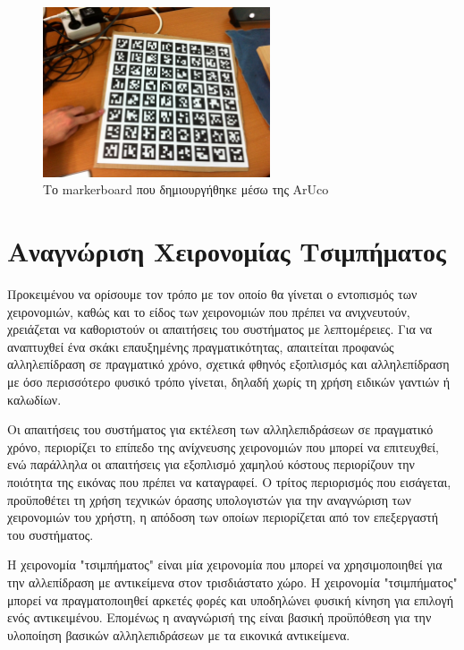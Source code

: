 \begin{figure}[H]
    \centering
    \includegraphics[width=0.6\textwidth]{Files/Figures/markerboard.jpg}
    \caption[Το markerboard που δημιουργήθηκε μέσω της ArUco]{Το markerboard που δημιουργήθηκε μέσω της ArUco}
    \label{fig:markerboard}
\end{figure}





\section{Αναγνώριση Χειρονομίας Τσιμπήματος} \label{section:pinch}



Προκειμένου να ορίσουμε τον τρόπο με τον οποίο θα γίνεται ο εντοπισμός των χειρονομιών, καθώς και το είδος των χειρονομιών που πρέπει να ανιχνευτούν, χρειάζεται να καθοριστούν οι απαιτήσεις του συστήματος με λεπτομέρειες.
Για να αναπτυχθεί ένα σκάκι επαυξημένης πραγματικότητας, απαιτείται προφανώς αλληλεπίδραση σε πραγματικό χρόνο, σχετικά φθηνός εξοπλισμός και αλληλεπίδραση με όσο περισσότερο φυσικό τρόπο γίνεται, δηλαδή χωρίς τη χρήση ειδικών γαντιών ή καλωδίων. 

Οι απαιτήσεις του συστήματος για εκτέλεση των αλληλεπιδράσεων σε πραγματικό χρόνο, περιορίζει το επίπεδο της ανίχνευσης χειρονομιών που μπορεί να επιτευχθεί, ενώ παράλληλα οι απαιτήσεις για εξοπλισμό χαμηλού κόστους περιορίζουν την ποιότητα της εικόνας που πρέπει να καταγραφεί. Ο τρίτος περιορισμός που εισάγεται, προϋποθέτει τη χρήση τεχνικών όρασης υπολογιστών για την αναγνώριση των χειρονομιών του χρήστη, η απόδοση των οποίων περιορίζεται από τον επεξεργαστή του συστήματος. 



Η χειρονομία "τσιμπήματος" είναι μία χειρονομία που μπορεί να χρησιμοποιηθεί για την αλλεπίδραση με αντικείμενα στον τρισδιάστατο χώρο. Η χειρονομία "τσιμπήματος" μπορεί να πραγματοποιηθεί αρκετές φορές και υποδηλώνει φυσική κίνηση για επιλογή ενός αντικειμένου. Επομένως η αναγνώρισή της είναι βασική προϋπόθεση για την υλοποίηση βασικών αλληλεπιδράσεων με τα εικονικά αντικείμενα. 


